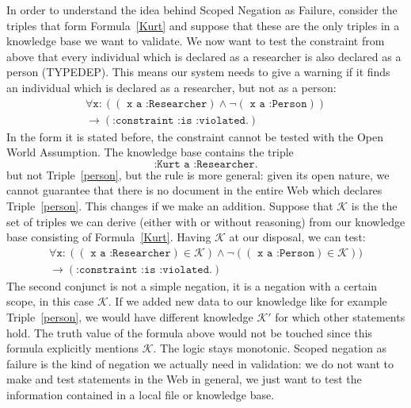 In order to understand the idea behind Scoped Negation as Failure,
consider the triples that form Formula~\ref{Kurt}
and suppose that these are the only triples in a 
knowledge base we want to validate. We now want to test the constraint from above that every individual which is declared as a researcher is also declared 
as a person (TYPEDEP). This means our system needs to give a warning if it finds an individual which is declared as a researcher, but not as a person:
\begin{multline}\label{constraint1}
 \forall \texttt{x}: ((\texttt{ x a :Researcher}) \wedge \neg (\texttt{ x a :Person}))\\ \rightarrow (\texttt{:constraint :is :violated.})
\end{multline}
In the form it is stated before, the constraint cannot be tested with the Open World Assumption. 
The knowledge base contains the triple 
\[\texttt{:Kurt a :Researcher.}\]
but not Triple~\ref{person},
but the rule is more general: given its open nature, 
we cannot guarantee that there is no document in the entire Web which declares Triple~\ref{person}.
This changes if we make an addition. Suppose that $\mathcal{K}$ is the
the set of triples
we can derive (either with or without reasoning) from our knowledge base consisting of Formula~\ref{Kurt}. Having $\mathcal{K}$ at our disposal, we can test:
\begin{multline}
 \forall \texttt{x}: ((\texttt{ x a :Researcher})\in \mathcal{K}) \wedge \neg ((\texttt{ x a :Person})\in \mathcal{K}))\\ \rightarrow (\texttt{:constraint :is :violated.})
\end{multline}
The second conjunct is not a simple negation, it is a negation with a certain scope, in this case $\mathcal{K}$. If we added new 
data to our knowledge like for example Triple~\ref{person}, we would have different knowledge $\mathcal{K}'$ for which other statements hold. The truth value of the formula above 
would not be touched since this formula explicitly mentions $\mathcal{K}$. The logic stays monotonic.
Scoped negation as failure is the kind of negation we actually need in \rdf validation: we do not want to make and
test
statements in the Web in general, we just want to test the information contained in a local file or knowledge base.


